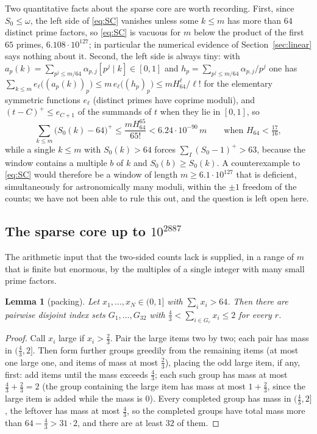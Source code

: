 \documentclass[11pt]{article}
\newtheorem{lemma}[theorem]{Lemma}
\theoremstyle{definition}
\begin{document}
Two quantitative facts about the sparse core are worth recording. First, since $S_0\le\omega$, the left side of \eqref{eq:SC} vanishes
unless some $k\le m$ has more than $64$ distinct prime factors, so \eqref{eq:SC} is vacuous for $m$ below the product of the first
$65$ primes, $6.108\cdot10^{127}$; in particular the numerical evidence of Section~\ref{sec:linear} says nothing about it.
Second, the left side is always tiny: with $a_p(k)=\sum_{p^j\le m/64}\alpha_{p,j}[p^j\mid k]\in[0,1]$ and
$h_p=\sum_{p^j\le m/64}\alpha_{p,j}/p^j$ one has $\sum_{k\le m}e_\ell\bigl((a_p(k))_p\bigr)\le m\,e_\ell\bigl((h_p)_p\bigr)\le mH_{64}^\ell/\ell!$
for the elementary symmetric functions $e_\ell$ (distinct primes have coprime moduli), and $(t-C)^+\le e_{C+1}$ of the summands of $t$
when they lie in $[0,1]$, so
\[
\sum_{k\le m}\bigl(S_0(k)-64\bigr)^+\le\frac{mH_{64}^{65}}{65!}<6.24\cdot10^{-90}\,m\qquad\text{when }H_{64}<\tfrac{17}{16},
\]
while a single $k\le m$ with $S_0(k)>64$ forces $\sum_I(S_0-1)^+>63$, because the window contains a multiple $b$ of $k$ and
$S_0(b)\ge S_0(k)$. A counterexample to \eqref{eq:SC} would therefore be a window of length $m\ge6.1\cdot10^{127}$ that is deficient,
simultaneously for astronomically many moduli, within the $\pm1$ freedom of the counts; we have not been able to rule this out, and the
question is left open here.

\subsection*{The sparse core up to $10^{2887}$}

The arithmetic input that the two-sided counts lack is supplied, in a range of $m$ that is finite but enormous, by the
multiples of a single integer with many small prime factors.

\begin{lemma}[packing]\label{lem:pack32}
Let $x_1,\dots,x_N\in(0,1]$ with $\sum_ix_i>64$. Then there are pairwise disjoint index sets $G_1,\dots,G_{32}$ with
$\tfrac43<\sum_{i\in G_r}x_i\le2$ for every $r$.
\end{lemma}
\begin{proof}
Call $x_i$ large if $x_i>\tfrac23$. Pair the large items two by two; each pair has mass in $(\tfrac43,2]$. Then form further
groups greedily from the remaining items (at most one large one, and items of mass at most $\tfrac23$), placing the odd large item, if
any, first: add items until the mass exceeds $\tfrac43$; each such group has mass at most $\tfrac43+\tfrac23=2$ (the group containing
the large item has mass at most $1+\tfrac23$, since the large item is added while the mass is $0$).
Every completed group has mass in $(\tfrac43,2]$, the leftover has mass at most $\tfrac43$, so the completed groups have total mass
more than $64-\tfrac43>31\cdot2$, and there are at least $32$ of them.
\end{proof}
\end{document}
